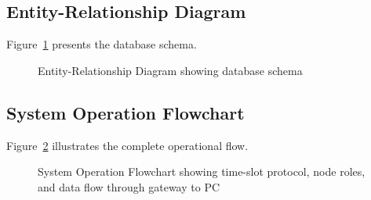 \subsection{Entity-Relationship Diagram}
\label{subsec:er-diagram}

Figure~\ref{fig:er-diagram} presents the database schema.

\begin{figure}[htbp]
    \centering
    \resizebox{0.95\textwidth}{!}{}
    \caption{Entity-Relationship Diagram showing database schema}
    \label{fig:er-diagram}
\end{figure}

\subsection{System Operation Flowchart}
\label{subsec:system-operation-flowchart}

Figure~\ref{fig:system-operation} illustrates the complete operational flow.

\begin{figure}[htbp]
    \centering
    \resizebox{0.7\textwidth}{!}{}
    \caption{System Operation Flowchart showing time-slot protocol, node roles, and data flow through gateway to PC}
    \label{fig:system-operation}
\end{figure}

